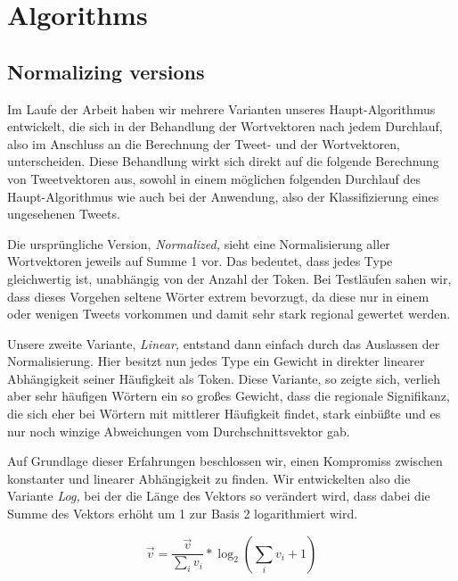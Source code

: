 \documentclass[../Main.tex]{subfiles}
\begin{document}
\section{Algorithms}
\subsection{Normalizing versions}
Im Laufe der Arbeit haben wir mehrere Varianten unseres Haupt-Algorithmus entwickelt, die sich in der Behandlung der Wortvektoren nach jedem Durchlauf, also im Anschluss an die Berechnung der Tweet- und der Wortvektoren, unterscheiden. Diese Behandlung wirkt sich direkt auf die folgende Berechnung von Tweetvektoren aus, sowohl in einem möglichen folgenden Durchlauf des Haupt-Algorithmus wie auch bei der Anwendung, also der Klassifizierung eines ungesehenen Tweets.

Die ursprüngliche Version, \textit{Normalized,} sieht eine Normalisierung aller Wortvektoren jeweils auf Summe 1 vor. Das bedeutet, dass jedes Type gleichwertig ist, unabhängig von der Anzahl der Token. Bei Testläufen sahen wir, dass dieses Vorgehen seltene Wörter extrem bevorzugt, da diese nur in einem oder wenigen Tweets vorkommen und damit sehr stark regional gewertet werden.

Unsere zweite Variante, \textit{Linear,} entstand dann einfach durch das Auslassen der Normalisierung. Hier besitzt nun jedes Type ein Gewicht in direkter linearer Abhängigkeit seiner Häufigkeit als Token. Diese Variante, so zeigte sich, verlieh aber sehr häufigen Wörtern ein so großes Gewicht, dass die regionale Signifikanz, die sich eher bei Wörtern mit mittlerer Häufigkeit findet, stark einbüßte und es nur noch winzige Abweichungen vom Durchschnittsvektor gab.

Auf Grundlage dieser Erfahrungen beschlossen wir, einen Kompromiss zwischen konstanter und linearer Abhängigkeit zu finden. Wir entwickelten also die Variante \textit{Log,} bei der die Länge des Vektors so verändert wird, dass dabei die Summe des Vektors erhöht um 1 zur Basis 2 logarithmiert wird.

$$\vec v = \frac{\vec v}{\sum_i v_i} * \log_2(\sum_i v_i+1)$$
\end{document}
